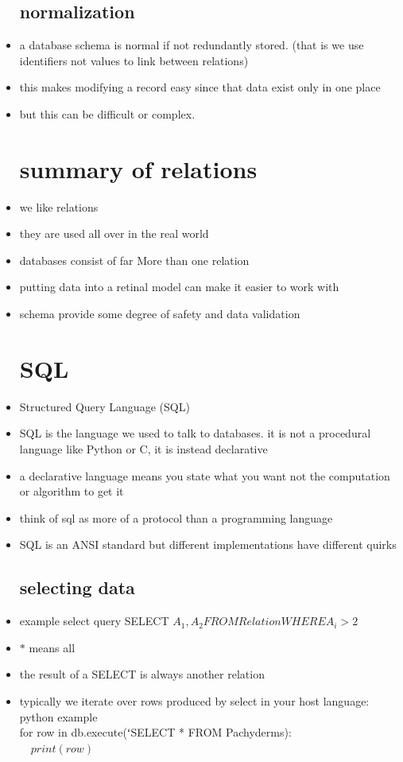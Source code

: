 \documentclass{article}
\begin{document}
\begin{itemize}
\subsection{normalization}
\item a database schema is normal if not redundantly stored. (that is we use identifiers not values to link between relations)
\item this makes modifying a record easy since that data exist only in one place
\item but this can be difficult or complex. 

\section{summary of relations}
\item we like relations 
\item they are used all over in the real world 
\item databases consist of far More than one relation 
\item putting data into a retinal model can make it easier to work with 
\item schema provide some degree of safety and data validation 
\section{SQL}
\item Structured Query Language (SQL)
\item SQL is the language we used to talk to databases. it is not a procedural language like Python or C, it is instead declarative
\item a declarative language   means you state what you want not the computation or algorithm to get it 
\item think of sql as more of a protocol than a programming language 
\item SQL is an ANSI standard but different implementations have different quirks
\subsection{selecting data }
\item example select query SELECT $A_1, A_2
FROM Relation
WHERE A_i > 2$ 
\item $*$ means all 
\item the result of a SELECT is always another relation
\item typically we iterate over rows produced by select in your host language: python example
\\ for row in db.execute(ʻSELECT * FROM Pachyderms):\\$\quad  print(row)$

\end{itemize}
\end{document}
